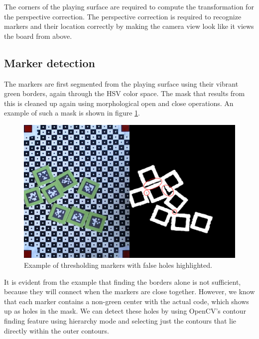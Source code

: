             The corners of the playing surface are required to compute the
            transformation for the perspective correction. The perspective
            correction is required to recognize markers and their location
            correctly by making the camera view look like it views the board
            from above.

        \subsection{Marker detection}
            The markers are first segmented from the playing surface using their
            vibrant green borders, again through the HSV color space. The mask
            that results from this is cleaned up again using morphological open
            and close operations. An example of such a mask is shown in
            figure \ref{fig:markerthresholding}.

            \begin{figure}[!ht]
                \centering
                \includegraphics[width=\textwidth]{MarkerThresholding}
                \caption{Example of thresholding markers with false holes highlighted.}
                \label{fig:markerthresholding}
            \end{figure}

            It is evident from the example that finding the borders alone is not
            sufficient, because they will connect when the markers are close
            together. However, we know that each marker contains a non-green
            center with the actual code, which shows up as holes in the mask. We
            can detect these holes by using OpenCV's contour finding feature
            using hierarchy mode and selecting just the contours that lie
            directly within the outer contours.

